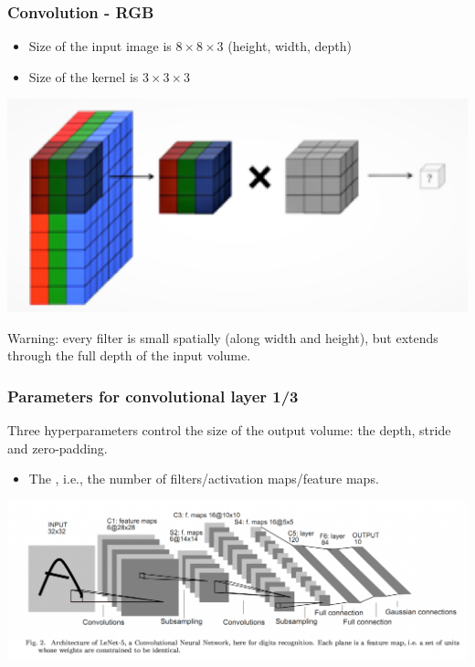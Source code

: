\begin{frame}
	\frametitle{Convolution - RGB}

\begin{itemize}
	\item Size of the input image is $8 \times 8 \times 3$ (height, width, depth)
	\item Size of the kernel is $3 \times 3 \times 3$
\end{itemize}

	\begin{center}
		\includegraphics[scale=0.9]{figs/kernel_volume.png}
	\end{center}

Warning: every filter is small spatially (along width and height), but extends through the full depth of the input volume.


\end{frame}


\begin{frame}
	\frametitle{Parameters for convolutional layer 1/3}

	Three hyperparameters control the size of the output volume: the depth, stride and zero-padding.

	\begin{itemize}
		\item The , i.e., the number of filters/activation maps/feature maps.
	\end{itemize}




		\begin{center}
			\includegraphics[scale=0.3]{figs/LeNet}
		\end{center}


\end{frame}

